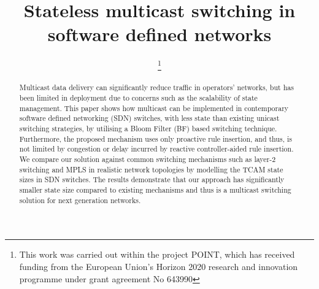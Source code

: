 \documentclass[conference]{IEEEtran}
\begin{document}
\title{Stateless multicast switching in software defined networks}

\author{\and {}\and
{}\thanks{This work was carried out within the project POINT, which has received funding from the European Union's Horizon 2020 research and innovation programme under grant agreement No 643990}}













\maketitle

\begin{abstract}
Multicast data delivery can significantly reduce traffic in operators' networks, but has been limited in deployment due to concerns such as the scalability of state management. This paper shows how multicast can be implemented in contemporary software defined networking (SDN) switches, with less state than existing unicast switching strategies, by utilising a Bloom Filter (BF) based switching technique. Furthermore, the proposed mechanism uses only proactive rule insertion, and thus, is not limited by congestion or delay incurred by reactive controller-aided rule insertion. We compare our solution against common switching mechanisms such as layer-2 switching and MPLS in realistic network topologies by modelling the TCAM state sizes in SDN switches.  The results demonstrate that our approach has significantly smaller state size compared to existing mechanisms and thus is a multicast switching solution for next generation networks.  \end{abstract}
\end{document}
